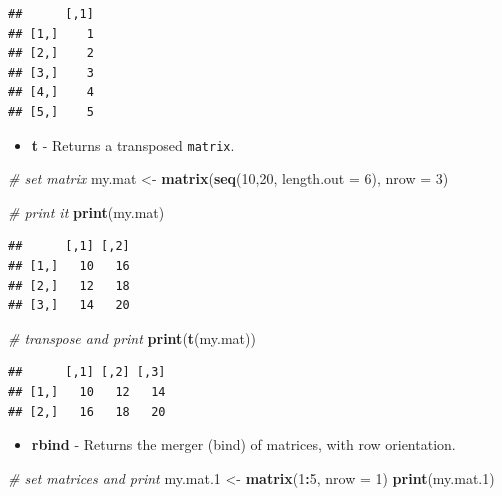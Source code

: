 \documentclass[11pt,]{book}
\newenvironment{Shaded}{\begin{snugshade}}{\end{snugshade}}
\newcommand{\KeywordTok}[1]{\textcolor[rgb]{0.27,0.27,0.27}{\textbf{#1}}}
\newcommand{\DataTypeTok}[1]{\textcolor[rgb]{0.27,0.27,0.27}{#1}}
\newcommand{\DecValTok}[1]{\textcolor[rgb]{0.06,0.06,0.06}{#1}}
\newcommand{\StringTok}[1]{\textcolor[rgb]{0.5,0.5,0.5}{#1}}
\newcommand{\CommentTok}[1]{\textcolor[rgb]{0.56,0.35,0.01}{\textit{#1}}}
\newcommand{\OperatorTok}[1]{\textcolor[rgb]{0.81,0.36,0.00}{\textbf{#1}}}
\newcommand{\NormalTok}[1]{#1}
\providecommand{\tightlist}{%
  \setlength{\itemsep}{0pt}\setlength{\parskip}{0pt}}
\begin{document}
\begin{verbatim}
##      [,1]
## [1,]    1
## [2,]    2
## [3,]    3
## [4,]    4
## [5,]    5
\end{verbatim}

\begin{itemize}
\tightlist
\item
  \textbf{t} - Returns a transposed \texttt{matrix}. 
\end{itemize}

\begin{Shaded}
\begin{Highlighting}[]
\CommentTok{# set matrix}
\NormalTok{my.mat <-}\StringTok{ }\KeywordTok{matrix}\NormalTok{(}\KeywordTok{seq}\NormalTok{(}\DecValTok{10}\NormalTok{,}\DecValTok{20}\NormalTok{, }\DataTypeTok{length.out =} \DecValTok{6}\NormalTok{), }\DataTypeTok{nrow =} \DecValTok{3}\NormalTok{)}

\CommentTok{# print it}
\KeywordTok{print}\NormalTok{(my.mat)}
\end{Highlighting}
\end{Shaded}

\begin{verbatim}
##      [,1] [,2]
## [1,]   10   16
## [2,]   12   18
## [3,]   14   20
\end{verbatim}

\begin{Shaded}
\begin{Highlighting}[]
\CommentTok{# transpose and print}
\KeywordTok{print}\NormalTok{(}\KeywordTok{t}\NormalTok{(my.mat))}
\end{Highlighting}
\end{Shaded}

\begin{verbatim}
##      [,1] [,2] [,3]
## [1,]   10   12   14
## [2,]   16   18   20
\end{verbatim}

\begin{itemize}
\tightlist
\item
  \textbf{rbind} - Returns the merger (bind) of matrices, with row
  orientation. 
\end{itemize}

\begin{Shaded}
\begin{Highlighting}[]
\CommentTok{# set matrices and print}
\NormalTok{my.mat.}\DecValTok{1}\NormalTok{ <-}\StringTok{ }\KeywordTok{matrix}\NormalTok{(}\DecValTok{1}\OperatorTok{:}\DecValTok{5}\NormalTok{, }\DataTypeTok{nrow =} \DecValTok{1}\NormalTok{)}
\KeywordTok{print}\NormalTok{(my.mat.}\DecValTok{1}\NormalTok{)}
\end{Highlighting}
\end{Shaded}
\end{document}
